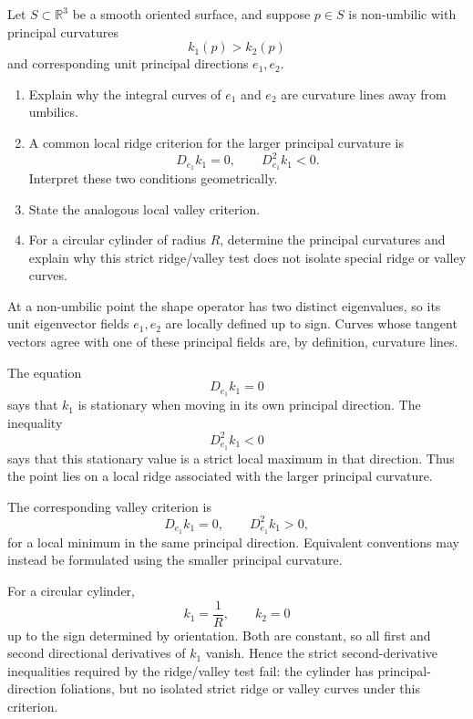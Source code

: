 \begin{problem}
\label{prob:cp-vii-0096}
Let \(S\subset\mathbb{R}^3\) be a smooth oriented surface, and suppose
\(p\in S\) is non-umbilic with principal curvatures
\[
k_1(p)>k_2(p)
\]
and corresponding unit principal directions \(e_1,e_2\).

\begin{enumerate}
\item Explain why the integral curves of \(e_1\) and \(e_2\) are curvature
lines away from umbilics.
\item A common local ridge criterion for the larger principal curvature is
\[
D_{e_1}k_1=0,
\qquad
D_{e_1}^2k_1<0.
\]
Interpret these two conditions geometrically.
\item State the analogous local valley criterion.
\item For a circular cylinder of radius \(R\), determine the principal
curvatures and explain why this strict ridge/valley test does not isolate
special ridge or valley curves.
\end{enumerate}
\end{problem}

\begin{solution}
At a non-umbilic point the shape operator has two distinct eigenvalues, so its
unit eigenvector fields \(e_1,e_2\) are locally defined up to sign.  Curves
whose tangent vectors agree with one of these principal fields are, by
definition, curvature lines.

The equation
\[
D_{e_1}k_1=0
\]
says that \(k_1\) is stationary when moving in its own principal direction.
The inequality
\[
D_{e_1}^2k_1<0
\]
says that this stationary value is a strict local maximum in that direction.
Thus the point lies on a local ridge associated with the larger principal
curvature.

The corresponding valley criterion is
\[
D_{e_1}k_1=0,
\qquad
D_{e_1}^2k_1>0,
\]
for a local minimum in the same principal direction.  Equivalent conventions
may instead be formulated using the smaller principal curvature.

For a circular cylinder,
\[
k_1=\frac1R,
\qquad
k_2=0
\]
up to the sign determined by orientation.  Both are constant, so all first
and second directional derivatives of \(k_1\) vanish.  Hence the strict
second-derivative inequalities required by the ridge/valley test fail:
the cylinder has principal-direction foliations, but no isolated strict
ridge or valley curves under this criterion.
\end{solution}
